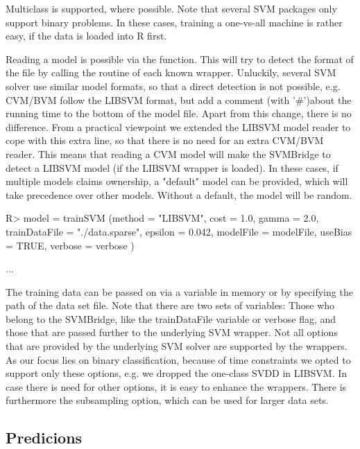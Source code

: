 \documentclass[article, shortnames]{jss}
\begin{document}
Multiclass is supported, where possible.
Note that several SVM packages only support binary problems.
In these cases, training a one-vs-all machine is rather easy, if the
data is loaded into R first. 


Reading a model is possible via the  function.
This will try to detect the format of the file by calling the 
 routine of each known wrapper.
Unluckily, several SVM solver use similar model formats, so that
a direct detection is not possible, e.g. CVM/BVM follow the LIBSVM
format, but add a comment (with '\#')about the running time to the
bottom of the model file. Apart from this change, there is no difference.
From a practical viewpoint we extended the LIBSVM model reader
to cope with this extra line, so that there is no need for an extra CVM/BVM reader.
This means that reading a CVM model will make the SVMBridge to detect a LIBSVM
model (if the LIBSVM wrapper is loaded).
In these cases, if multiple models claims ownership, a "default" model can be provided,
which will take precedence over other models. Without a default,
the model will be random.

\begin{CodeChunk}
\begin{CodeInput}
R> model = trainSVM (method = "LIBSVM", cost = 1.0, gamma = 2.0,
			trainDataFile = "./data.sparse",
			epsilon = 0.042,
			modelFile = modelFile,
			useBias = TRUE,
			verbose = verbose
		)
\end{CodeInput}
\begin{CodeOutput}
...
\end{CodeOutput}
\end{CodeChunk}

The training data can be passed on via a variable in memory or by specifying the path 
of the data set file. 
Note that there are two sets of variables: Those who belong to the SVMBridge,
like the trainDataFile variable or verbose flag, and those that are passed further
to the underlying SVM wrapper.
Not all options that are provided by the underlying SVM solver
are supported by the wrappers. As our focus lies on binary classification, because of time constraints 
we opted  to support only these options, e.g. we dropped the one-class SVDD in LIBSVM.
In case there is need for other options, it is 
easy to enhance the wrappers.
There is furthermore the subsampling option, which can be used for larger data sets.


\subsection{Predicions}
\end{document}

